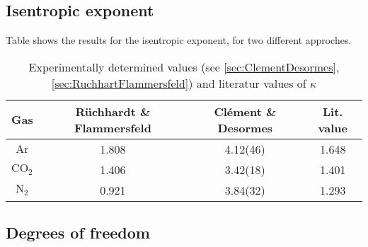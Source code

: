 \documentclass[../main.tex]{subfiles}
\begin{document}
    \subsection{Isentropic exponent}
        Table shows the results for the isentropic exponent, for two different approches.
        \begin{table}[H]
            \centering
            \begin{tabular}{c|cc|c}
                \textbf{Gas} & \textbf{Rüchhardt \& Flammersfeld} & \textbf{Clément \& Desormes} & \textbf{Lit. value}\\
                \hline
                $\text{Ar}$ & 1.808 & 4.12(46)  & 1.648\\
                $\text{CO}_2$ & 1.406 & 3.42(18) & 1.401\\
                $\text{N}_2$ & 0.921 & 3.84(32) & 1.293\\
            \end{tabular}
            \caption{Experimentally determined values (see \ref{sec:ClementDesormes}, \ref{sec:RuchhartFlammersfeld}) and literatur values of $\kappa$}
        \end{table}

        

    \subsection{Degrees of freedom}
\end{document}
